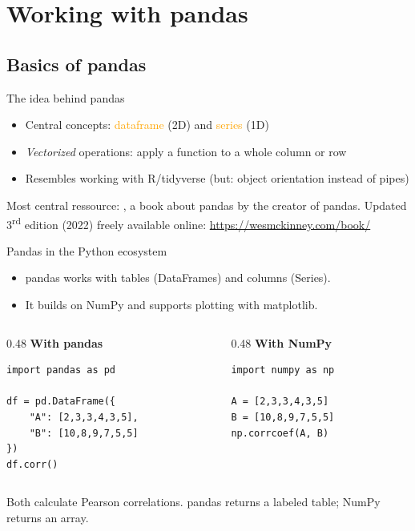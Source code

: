 \section{Working with pandas}

\subsection{Basics of pandas}

\begin{frame}{The idea behind pandas}
  \begin{itemize}
  \item Central concepts: \textcolor{orange}{dataframe} (2D) and \textcolor{orange}{series} (1D)
  \item \emph{Vectorized} operations: apply a function to a whole column or row
  \item Resembles working with R/tidyverse (but: object orientation instead of pipes)
  \end{itemize}
  \pause
Most central ressource: \textcite{McKinney2012}, a book about pandas by the creator of pandas. Updated 3\textsuperscript{rd} edition (2022) freely available online: \url{https://wesmckinney.com/book/}
\end{frame}


\begin{frame}[fragile]{Pandas in the Python ecosystem}
  \begin{itemize}
  \item pandas works with tables (DataFrames) and columns (Series).
  \item It builds on NumPy and supports plotting with matplotlib.
  \end{itemize}

\begin{columns}[T,onlytextwidth]
\begin{column}{0.48\textwidth}
\textbf{With pandas}
\begin{verbatim}
import pandas as pd

df = pd.DataFrame({
    "A": [2,3,3,4,3,5],
    "B": [10,8,9,7,5,5]
})
df.corr()
\end{verbatim}
\end{column}
\begin{column}{0.48\textwidth}
\textbf{With NumPy}
\begin{verbatim}
import numpy as np

A = [2,3,3,4,3,5]
B = [10,8,9,7,5,5]
np.corrcoef(A, B)
\end{verbatim}
\end{column}
\end{columns}

\medskip
Both calculate Pearson correlations. pandas returns a labeled table; NumPy returns an array.
\end{frame}





